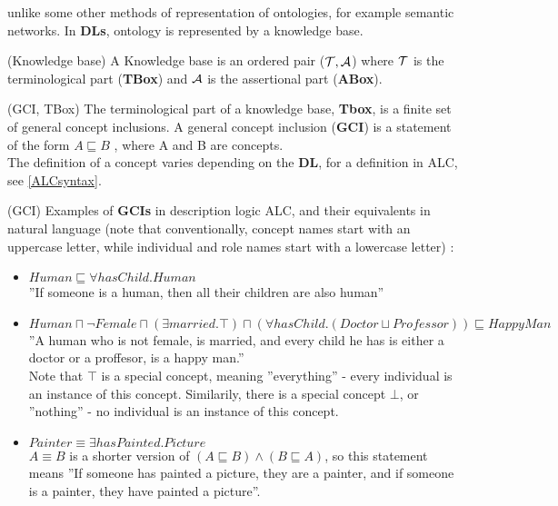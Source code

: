 unlike some other methods of representation of ontologies, for example semantic networks. In \textbf{DLs}, ontology is represented by a knowledge base.
\begin{mydef} (Knowledge base)
A Knowledge base is an ordered pair ($\mathcal{T},\mathcal{A}$) where $\mathcal{T}$ is the terminological part (\textbf{TBox}) and $\mathcal{A}$ is the assertional part (\textbf{ABox}). 
\end{mydef}
\begin{mydef} (GCI, TBox)
The terminological part of a knowledge base, \textbf{Tbox}, is a finite set of general concept inclusions.
A general concept inclusion (\textbf{GCI}) is a statement of the form $A \sqsubseteq B$ , where A and B are concepts. \\
The definition of a concept varies depending on the \textbf{DL}, for a definition in ALC, see \ref{ALCsyntax}.
\end{mydef}
\begin{myex} \label{TBoxEx}(GCI) 
Examples of \textbf{GCIs} in description logic ALC, and their equivalents in natural language (note that conventionally, concept names start with an uppercase letter, while individual and role names start with a lowercase letter) : \\
\begin{itemize}
\item $Human \sqsubseteq \forall hasChild.Human$ \\
''If someone is a human, then all their children are also human'' 
\item  $ Human  \sqcap  \neg  Female  \sqcap  (\exists  married.\top) \sqcap
(\forall  hasChild.(Doctor  \sqcup  Professor)) \sqsubseteq HappyMan $  \\
''A human who is not female, is married, and every child he has is either a doctor or a proffesor, is a happy man.'' \\
Note that $\top$ is a special concept, meaning ''everything'' - every individual is an instance of this concept. Similarily, there is a special concept $\bot$, or ''nothing'' - no individual is an instance of this concept. 

\item $Painter \equiv \exists hasPainted.Picture$ \\
$ A \equiv B$ is a shorter version of $(A \sqsubseteq B)  \land (B \sqsubseteq A)$, so this statement means
''If someone has painted a picture, they are a painter, and if someone is a painter, they have painted a picture''. 
\end{itemize}
\end{myex}
